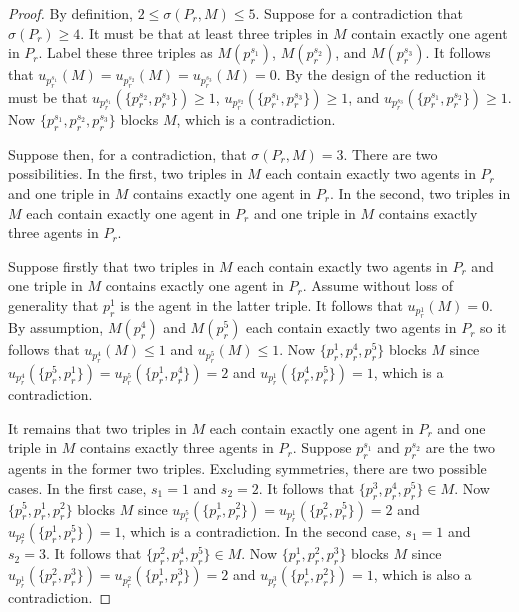 \begin{proof}
By definition, $2 \leq \sigma(P_r, M) \leq 5$. Suppose for a contradiction that $\sigma(P_r) \geq 4$. It must be that at least three triples in $M$ contain exactly one agent in $P_r$. Label these three triples as $M(p_r^{s_1})$, $M(p_r^{s_2})$, and $M(p_r^{s_3})$. It follows that $u_{p_r^{s_1}}(M) = u_{p_r^{s_2}}(M) = u_{p_r^{s_3}}(M) = 0$. By the design of the reduction it must be that $u_{p_r^{s_1}}(\{p_r^{s_2}, p_r^{s_3}\}) \geq 1$, $u_{p_r^{s_2}}(\{p_r^{s_1}, p_r^{s_3}\}) \geq 1$, and $u_{p_r^{s_3}}(\{p_r^{s_1}, p_r^{s_2}\}) \geq 1$. Now $\{ p_r^{s_1}, p_r^{s_2},p_r^{s_3} \}$ blocks $M$, which is a contradiction.

Suppose then, for a contradiction, that $\sigma(P_r, M) = 3$. There are two possibilities. In the first, two triples in $M$ each contain exactly two agents in $P_r$ and one triple in $M$ contains exactly one agent in $P_r$. In the second, two triples in $M$ each contain exactly one agent in $P_r$ and one triple in $M$ contains exactly three agents in $P_r$.

Suppose firstly that two triples in $M$ each contain exactly two agents in $P_r$ and one triple in $M$ contains exactly one agent in $P_r$. Assume without loss of generality that $p_r^1$ is the agent in the latter triple. It follows that $u_{p_r^1}(M) = 0$. By assumption, $M(p_r^4)$ and $M(p_r^5)$ each contain exactly two agents in $P_r$ so it follows that $u_{p_r^4}(M) \leq 1$ and $u_{p_r^5}(M) \leq 1$. Now $\{ p_r^1, p_r^4, p_r^5 \}$ blocks $M$ since $u_{p_r^4}(\{p_r^5, p_r^1\}) = u_{p_r^5}(\{p_r^1, p_r^4\}) = 2$ and $u_{p_r^1}(\{p_r^4, p_r^5\}) = 1$, which is a contradiction.

It remains that two triples in $M$ each contain exactly one agent in $P_r$ and one triple in $M$ contains exactly three agents in $P_r$. Suppose $p_r^{s_1}$ and $p_r^{s_2}$ are the two agents in the former two triples. Excluding symmetries, there are two possible cases. In the first case, $s_1 = 1$ and $s_2 = 2$. It follows that $\{ p_r^3, p_r^4, p_r^5 \} \in M$. Now $\{p_r^5, p_r^1, p_r^2 \}$ blocks $M$ since $u_{p_r^5}(\{p_r^1, p_r^2\}) = u_{p_r^1}(\{p_r^2, p_r^5\}) = 2$ and $u_{p_r^2}(\{p_r^1, p_r^5\}) = 1$, which is a contradiction. In the second case, $s_1 = 1$ and $s_2 = 3$. It follows that $\{ p_r^2, p_r^4, p_r^5 \} \in M$. Now $\{p_r^1, p_r^2, p_r^3 \}$ blocks $M$ since $u_{p_r^1}(\{p_r^2, p_r^3\}) = u_{p_r^2}(\{p_r^1, p_r^3\}) = 2$ and $u_{p_r^3}(\{p_r^1, p_r^2\}) = 1$, which is also a contradiction.
\end{proof}

